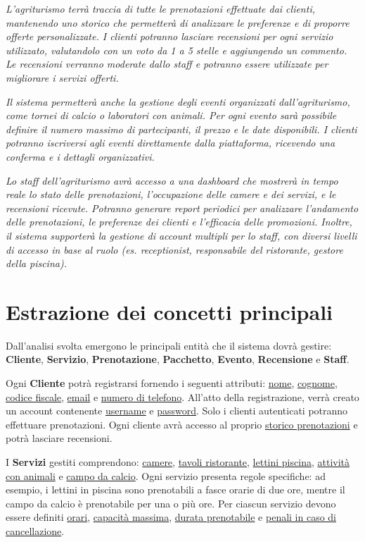 \documentclass[a4paper,12pt]{report}
\begin{document}
\textit{L'agriturismo terrà traccia di tutte le prenotazioni effettuate dai clienti, mantenendo uno storico che permetterà
	di analizzare le preferenze e di proporre offerte personalizzate. I clienti potranno lasciare recensioni per ogni servizio utilizzato, valutandolo
	con un voto da 1 a 5 stelle e aggiungendo un commento. Le recensioni verranno moderate dallo staff e potranno essere utilizzate per
	migliorare i servizi offerti.}

\textit{Il sistema permetterà anche la gestione degli eventi organizzati dall'agriturismo, come tornei di calcio o laboratori con animali. Per ogni
	evento sarà possibile definire il numero massimo di partecipanti, il prezzo e le date disponibili. I clienti potranno iscriversi agli eventi direttamente
	dalla piattaforma, ricevendo una conferma e i dettagli organizzativi.}

\textit{Lo staff dell'agriturismo avrà accesso a una dashboard che mostrerà in tempo reale lo stato delle prenotazioni, l'occupazione delle
	camere e dei servizi, e le recensioni ricevute. Potranno generare report periodici per analizzare l'andamento delle prenotazioni, le preferenze dei clienti e
	l'efficacia delle promozioni. Inoltre, il sistema supporterà la gestione di account multipli per lo staff, con diversi livelli di accesso in base al
	ruolo (es. receptionist, responsabile del ristorante, gestore della piscina).}

\section{Estrazione dei concetti principali}
Dall'analisi svolta emergono le principali entità che il sistema dovrà gestire: \textbf{Cliente}, \textbf{Servizio}, \textbf{Prenotazione},
\textbf{Pacchetto}, \textbf{Evento}, \textbf{Recensione} e \textbf{Staff}.

Ogni \textbf{Cliente} potrà registrarsi fornendo i seguenti attributi: \newline \underline{nome}, \underline{cognome}, \underline{codice fiscale},
\underline{email} e \underline{numero di telefono}. All'atto della registrazione, verrà creato un account contenente \underline{username} e \underline{password}. Solo i clienti
autenticati potranno effettuare prenotazioni. Ogni cliente avrà accesso al proprio \underline{storico prenotazioni} e potrà lasciare recensioni.

I \textbf{Servizi} gestiti comprendono: \underline{camere}, \underline{tavoli ristorante}, \newline \underline{lettini piscina}, \underline{attività con
	animali} e \underline{campo da calcio}. Ogni servizio presenta regole specifiche: ad esempio, i lettini in piscina sono prenotabili a fasce orarie di
due ore, mentre il campo da calcio è prenotabile per una o più ore. Per ciascun servizio devono essere definiti \underline{orari}, \underline{capacità massima},
\underline{durata prenotabile} e \underline{penali in caso di cancellazione}.
\end{document}
